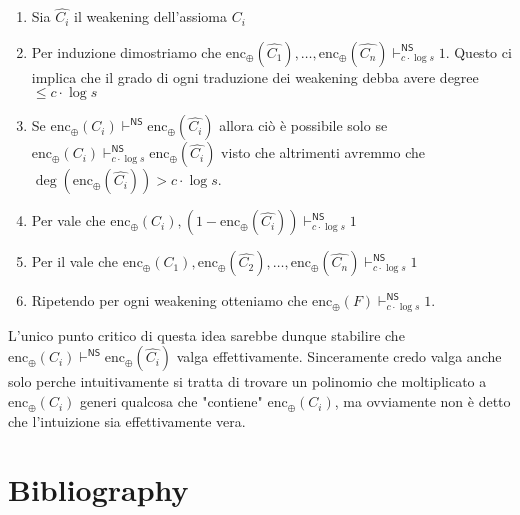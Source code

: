 \documentclass[12pt]{article}
\theoremstyle{definition}
\newcommand{\NS}{\mathsf{NS}}
\newcommand{\enc}{\mathrm{enc}}
\begin{document}
    \begin{enumerate}
        \item Sia $\widehat{C_i}$ il weakening dell'assioma $C_i$
        \item Per induzione dimostriamo che $\enc_{\oplus}(\widehat{C_1}), \ldots, \enc_{\oplus}(\widehat{C_n}) \vdash_{c \cdot \log s}^\NS 1$. Questo ci implica che il grado di ogni traduzione dei weakening debba avere degree $\leq c \cdot \log s$
        \item Se $\enc_{\oplus}(C_i) \vdash^\NS \enc_{\oplus}(\widehat{C_i})$ allora ciò è possibile solo se $\enc_{\oplus}(C_i) \vdash_{c \cdot \log s}^\NS \enc_{\oplus}(\widehat{C_i})$ visto che altrimenti avremmo che $\deg(\enc_{\oplus}(\widehat{C_i})) > c \cdot \log s$.
        \item Per  vale che $\enc_{\oplus}(C_i), (1-\enc_{\oplus}(\widehat{C_i})) \vdash_{c \cdot \log s}^\NS 1$
        \item Per il  vale che $\enc_{\oplus}(C_1), \enc_{\oplus}(\widehat{C_2}), \ldots, \enc_{\oplus}(\widehat{C_n}) \vdash_{c \cdot \log s}^\NS 1$
        \item Ripetendo per ogni weakening otteniamo che $\enc_{\oplus}(F) \vdash_{c \cdot \log s}^\NS 1$.
    \end{enumerate}

    L'unico punto critico di questa idea sarebbe dunque stabilire che $\enc_{\oplus}(C_i) \vdash^\NS \enc_{\oplus}(\widehat{C_i})$ valga effettivamente. Sinceramente credo valga anche solo perche intuitivamente si tratta di trovare un polinomio che moltiplicato a $\enc_{\oplus}(C_i)$ generi qualcosa che "contiene" $\enc_{\oplus}(C_i)$, ma ovviamente non è detto che l'intuizione sia effettivamente vera.


    \newpage
    \section{Bibliography}
    \printbibliography
    
    
\end{document}
